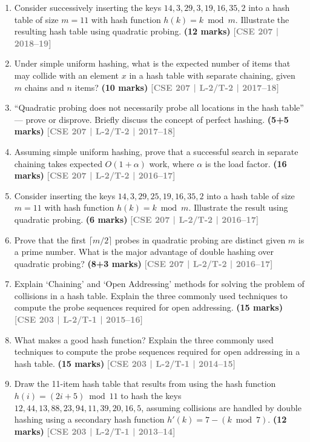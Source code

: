 \documentclass[12pt,a3paper]{article}
\newcommand{\yr}[1]{\hfill\textcolor{gray}{\small\textbf{[#1]}}}
\newcommand{\mk}[1]{\textcolor{orange!70!black}{\small\textbf{(#1 marks)}}}
\begin{document}
\begin{enumerate}
\item Consider successively inserting the keys $14, 3, 29, 3, 19, 16, 35, 2$ into a hash table of size $m = 11$ with hash function $h(k) = k \bmod m$. Illustrate the resulting hash table using quadratic probing. \mk{12}
\yr{CSE 207 | 2018--19}

\item Under simple uniform hashing, what is the expected number of items that may collide with an element $x$ in a hash table with separate chaining, given $m$ chains and $n$ items? \mk{10}
\yr{CSE 207 | L-2/T-2 | 2017--18}

\item ``Quadratic probing does not necessarily probe all locations in the hash table'' --- prove or disprove. Briefly discuss the concept of perfect hashing. \mk{5+5}
\yr{CSE 207 | L-2/T-2 | 2017--18}

\item Assuming simple uniform hashing, prove that a successful search in separate chaining takes expected $O(1 + \alpha)$ work, where $\alpha$ is the load factor. \mk{16}
\yr{CSE 207 | L-2/T-2 | 2016--17}


\item Consider inserting the keys $14, 3, 29, 25, 19, 16, 35, 2$ into a hash table of size $m = 11$ with hash function $h(k) = k \bmod m$. Illustrate the result using quadratic probing. \mk{6}
\yr{CSE 207 | L-2/T-2 | 2016--17}


\item Prove that the first $\lceil m/2 \rceil$ probes in quadratic probing are distinct given $m$ is a prime number. What is the major advantage of double hashing over quadratic probing? \mk{8+3}
\yr{CSE 207 | L-2/T-2 | 2016--17}

\item Explain `Chaining' and `Open Addressing' methods for solving the problem of collisions in a hash table. Explain the three commonly used techniques to compute the probe sequences required for open addressing. \mk{15}
\yr{CSE 203 | L-2/T-1 | 2015--16}

\item What makes a good hash function? Explain the three commonly used techniques to compute the probe sequences required for open addressing in a hash table. \mk{15}
\yr{CSE 203 | L-2/T-1 | 2014--15}

\item Draw the 11-item hash table that results from using the hash function $h(i) = (2i + 5) \bmod 11$ to hash the keys $12, 44, 13, 88, 23, 94, 11, 39, 20, 16, 5$, assuming collisions are handled by double hashing using a secondary hash function $h'(k) = 7 - (k \bmod 7)$. \mk{12}
\yr{CSE 203 | L-2/T-1 | 2013--14}


\end{enumerate}
\end{document}
